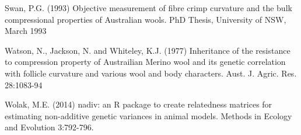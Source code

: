 \documentclass[titlepage]{article}  %
\begin{document}
\begin{thebibliography}{99}
Swan, P.G. (1993) Objective measurement of fibre crimp curvature and the bulk compressional properties of Australian wools. PhD Thesis, University of NSW, March 1993 

Watson, N., Jackson, N. and Whiteley, K.J. (1977) Inheritance of the resistance
    to compression property of Austrailian Merino wool and its genetic 
    correlation with follicle curvature and various wool and body 
    characters. Aust. J. Agric. Res. 28:1083-94

Wolak, M.E. (2014) nadiv: an R package to create relatedness matrices for
    estimating non-additive genetic variances in animal models.
    Methods in Ecology and Evolution 3:792-796.

\end{thebibliography}

%
%
%
%
%
%
%
\end{document}
